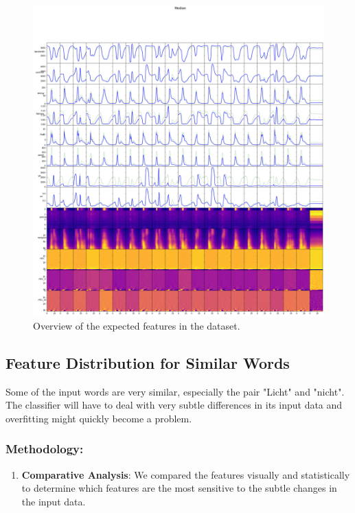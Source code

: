 \begin{figure}[!ht]
	\centering
	\begin{minipage}{0.49\textwidth}
		\centering
		\includegraphics[scale=0.3]{fig/Task2.4_Summary.png}
		\caption{Overview of the expected features in the dataset.}
		\label{fig:FeaturesSummary}
	\end{minipage}\hfill
\end{figure}

\subsection{Feature Distribution for Similar Words}

Some of the input words are very similar, especially the pair "Licht" and "nicht". The classifier will have to deal with very subtle differences in its input data and overfitting might quickly become a problem.

\subsubsection{Methodology:}

\begin{enumerate}
    \item \textbf{Comparative Analysis}: We compared the features visually and statistically to determine which features are the most sensitive to the subtle changes in the input data.
\end{enumerate}

